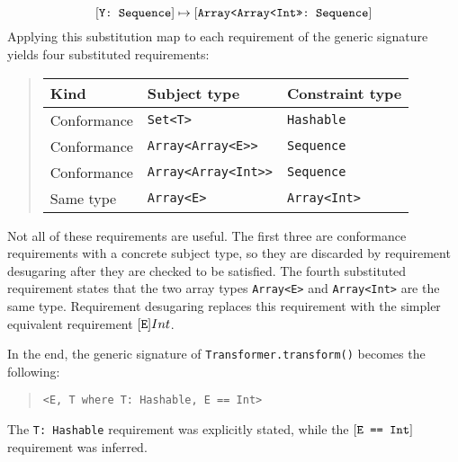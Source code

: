 \documentclass[../generics]{subfiles}
\begin{document}
\begin{example}
\[{[\texttt{Y:~Sequence}] \mapsto [\texttt{Array<Array<Int>>:~Sequence}]}
\]
Applying this substitution map to each requirement of the generic signature yields four substituted requirements:
\begin{quote}
\begin{tabular}{lll}
\toprule
\textbf{Kind}&\textbf{Subject type}&\textbf{Constraint type}\\
\midrule
Conformance&\texttt{Set<T>}&\texttt{Hashable}\\
Conformance&\texttt{Array<Array<E>>}&\texttt{Sequence}\\
Conformance&\texttt{Array<Array<Int>>}&\texttt{Sequence}\\
Same type&\texttt{Array<E>}&\texttt{Array<Int>}\\
\bottomrule
\end{tabular}
\end{quote}
Not all of these requirements are useful. The first three are conformance requirements with a concrete subject type, so they are discarded by requirement desugaring after they are checked to be satisfied. The fourth substituted requirement states that the two array types \texttt{Array<E>} and \texttt{Array<Int>} are the same type. Requirement desugaring replaces this requirement with the simpler equivalent requirement $[\texttt{E}]{Int}$.

In the end, the generic signature of \texttt{Transformer.transform()} becomes the following:
\begin{quote}
\begin{verbatim}
<E, T where T: Hashable, E == Int>
\end{verbatim}
\end{quote}
The \verb|T: Hashable| requirement was explicitly stated, while the $[\texttt{E == Int}]$ requirement was inferred.
\end{example}
\end{document}
